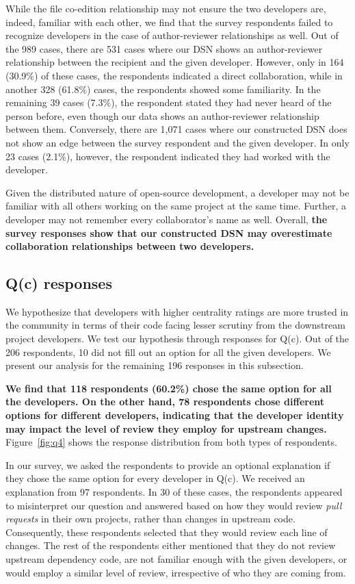 \documentclass[10pt,journal,compsoc]{IEEEtran}
\begin{document}
While the file co-edition relationship may not ensure the two developers are, indeed, familiar with each other, we find that the survey respondents failed to recognize developers in the case of author-reviewer relationships as well. Out of the 989 cases, there are 531 cases where our DSN shows an author-reviewer relationship between the recipient and the given developer. However, only in 164 (30.9\%) of these cases, the respondents indicated a direct collaboration, while in another 328 (61.8\%) cases, the respondents showed some familiarity. 
In the remaining 39 cases (7.3\%), the respondent stated they had never heard of the person before, even though our data shows an author-reviewer relationship between them. 
Conversely, there are 1,071 cases where our constructed DSN does not show an edge between the survey respondent and the given developer. In only 23 cases (2.1\%), however, the respondent indicated they had worked with the developer.


Given the distributed nature of open-source development, a developer may not be familiar with all others working on the same project at the same time. Further, a developer may not remember every collaborator's name as well. 
Overall, \textbf{the survey responses show that our constructed DSN may overestimate collaboration relationships between two developers.}


\subsection{Q(c) responses}
We hypothesize that developers with higher centrality ratings are more trusted in the community in terms of their code facing lesser scrutiny from the downstream project developers. We test our hypothesis through responses for Q(c). Out of the 206 respondents, 10 did not fill out an option for all the given developers. We present our analysis for the remaining 196 responses in this subsection.

\textbf{We find that 118 respondents (60.2\%) chose the same option for all the developers. On the other hand, 78 respondents chose different options for different developers, indicating that the developer identity may impact the level of review they employ for upstream changes. }Figure~\ref{fig:q4} shows the response distribution from both types of respondents. 

In our survey, we asked the respondents to provide an optional explanation if they chose the same option for every developer in Q(c). We received an explanation from 97 respondents. In 30 of these cases, the respondents appeared to misinterpret our question and answered based on how they would review \textit{pull requests} in their own projects, rather than changes in upstream code. Consequently, these respondents selected that they would review each line of changes. The rest of the respondents either mentioned that they do not review upstream dependency code, are not familiar enough with the given developers, or would employ a similar level of review, irrespective of who they are coming from. 
\end{document}
